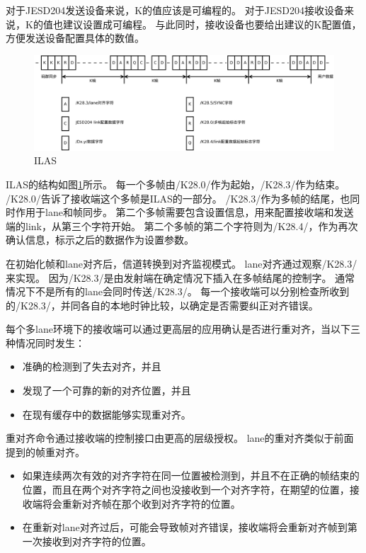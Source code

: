 \documentclass[UTF8]{ctexart}
\begin{document}
对于JESD204发送设备来说，K的值应该是可编程的。
对于JESD204接收设备来说，K的值也建议设置成可编程。
与此同时，接收设备也要给出建议的K配置值，方便发送设备配置具体的数值。

\begin{figure}[H]
	\centering
	\includegraphics[width=16cm]{./img/ilas.pdf}
	\caption{ILAS}
	\label{fig:ilas}
\end{figure}

ILAS的结构如图\ref{fig:ilas}所示。
每一个多帧由/K28.0/作为起始，/K28.3/作为结束。
/K28.0/告诉了接收端这个多帧是ILAS的一部分。
/K28.3/作为多帧的结尾，也同时作用于lane和帧同步。
第二个多帧需要包含设置信息，用来配置接收端和发送端的link，从第三个字符开始。
第二个多帧的第二个字符则为/K28.4/，作为再次确认信息，标示之后的数据作为设置参数。

在初始化帧和lane对齐后，信道转换到对齐监视模式。
lane对齐通过观察/K28.3/来实现。
因为/K28.3/是由发射端在确定情况下插入在多帧结尾的控制字。
通常情况下不是所有的lane会同时传送/K28.3/。
每一个接收端可以分别检查所收到的/K28.3/，并同各自的本地时钟比较，以确定是否需要纠正对齐错误。


每个多lane环境下的接收端可以通过更高层的应用确认是否进行重对齐，当以下三种情况同时发生：
\begin{itemize}
	\item 准确的检测到了失去对齐，并且
	\item 发现了一个可靠的新的对齐位置，并且
	\item 在现有缓存中的数据能够实现重对齐。
\end{itemize}
重对齐命令通过接收端的控制接口由更高的层级授权。
lane的重对齐类似于前面提到的帧重对齐。
\begin{itemize}
	\item 如果连续两次有效的对齐字符在同一位置被检测到，并且不在正确的帧结束的位置，而且在两个对齐字符之间也没接收到一个对齐字符，在期望的位置，接收端将会重新对齐帧在那个收到对齐字符的位置。
	\item 在重新对lane对齐过后，可能会导致帧对齐错误，接收端将会重新对齐帧到第一次接收到对齐字符的位置。
\end{itemize}
\end{document}

